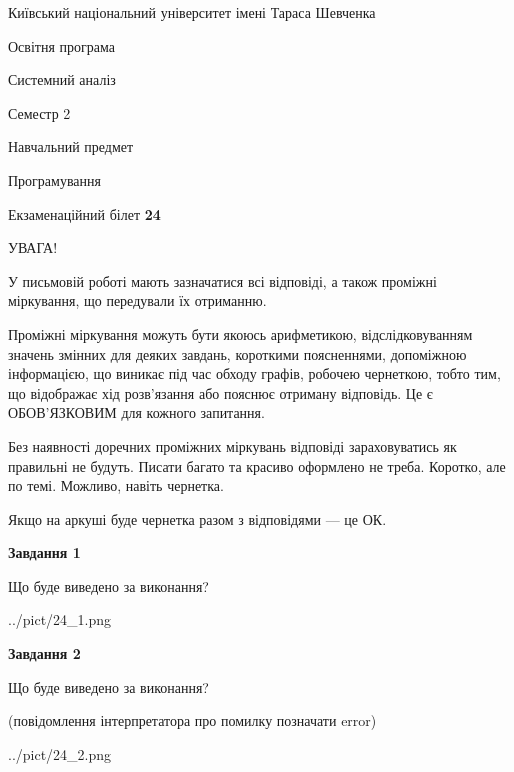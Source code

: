 \documentclass[12pt, ukrainian]{article}
\begin{document}
{{\begin {small}\par
{ \center  Київський національний університет імені Тараса Шевченка \par}
{\parbox {5 cm}{Освітня програма \hfill}{\parbox {7 cm}{Системний аналіз \hfill}}\parbox {6 cm}{\hfill Семестр 2}}\par
{\parbox {5 cm} {Навчальний предмет \hfill}\parbox {7 cm}{Програмування \hfill}\parbox {6cm}{\hfill}\par}\vspace{-7pt} \end{small}}{\center Екзаменаційний білет \No \textbf
{ 24 }\par}}
{
\begin {large}
УВАГА!

У письмовій роботі мають зазначатися всі відповіді, а також проміжні міркування, що передували їх отриманню.

Проміжні міркування можуть бути якоюсь арифметикою, відслідковуванням зна\-чень змінних для деяких завдань,
короткими поясненнями, допоміжною інформацією, що виникає під час обходу графів, робочею чернеткою,
тобто тим, що відображає хід розв’язання або пояснює отриману відповідь.
Це є ОБОВ’ЯЗКОВИМ для кожного запитання.

Без наявності доречних проміжних міркувань відповіді зараховуватись як правиль\-ні не будуть.
Писати багато та красиво оформлено не треба. Коротко, але по темі. Можли\-во, навіть чернетка.

Якщо на аркуші буде чернетка разом з відповідями --- це ОК.

\newpage

{\begin {center}\textbf{Завдання 1}\end {center}}\par
Що буде виведено за виконання?\par
\begin{center}
	{../pict/24_1.png}
\end{center}
\newpage

{\begin {center}\textbf{Завдання 2}\end {center}}\par
Що буде виведено за виконання?\par
 (повідомлення інтерпретатора про помилку позначати error)\par
\begin{center}
	{../pict/24_2.png}
\end{center}
\newpage


\end{large}}
\end{document}
